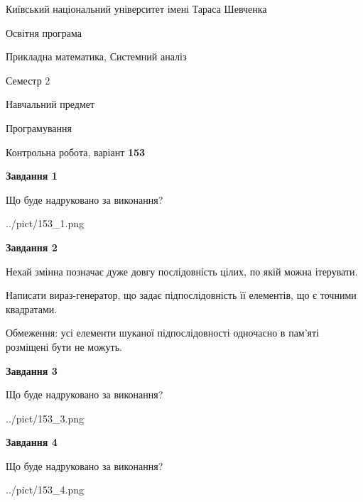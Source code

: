 \documentclass[12pt, ukrainian]{article}
\begin{document}
{{\begin {small}\par
{ \center  Київський національний університет імені Тараса Шевченка \par}
{\parbox {5 cm}{Освітня програма \hfill}{\parbox {8 cm}{Прикладна математика, Системний аналіз \hfill}}\parbox {5 cm}{\hfill Семестр 2}}\par
{\parbox {5 cm} {Навчальний предмет \hfill}\parbox {7 cm}{Програмування \hfill}\parbox {6cm}{\hfill}\par}\vspace{-7pt} \end{small}}{\center Контрольна робота, варіант  \No \textbf
{ 153 }\par}}
{
\begin {large}
{\begin {center}\textbf{Завдання 1}\end {center}}\par
Що буде надруковано за виконання?\par\par
\begin{center}
	{../pict/153_1.png}
\end{center}
\newpage

{\begin {center}\textbf{Завдання 2}\end {center}}\par
Нехай змінна  позначає дуже довгу послідовність цілих, по якій можна ітерувати.

Написати вираз-генератор, що задає підпослідовність її елементів, що є точними квадратами.

Обмеження: усі елементи шуканої підпослідовності одночасно в пам'яті розміщені бути не можуть.\par
\newpage

{\begin {center}\textbf{Завдання 3}\end {center}}\par
Що буде надруковано за виконання?\par
\begin{center}
	{../pict/153_3.png}
\end{center}
\newpage

{\begin {center}\textbf{Завдання 4}\end {center}}\par
Що буде надруковано за виконання?\par
\begin{center}
	{../pict/153_4.png}
\end{center}
\newpage


\end{large}}
\end{document}

